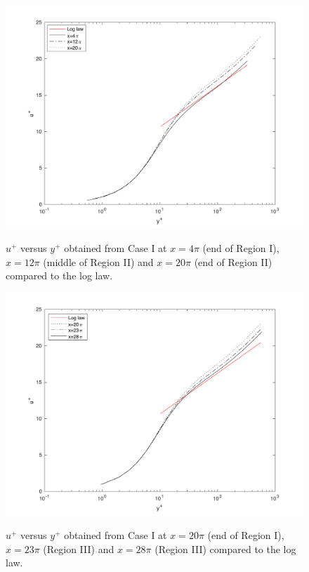 \documentclass[twocolumn,10pt]{asme2e}
\begin{document}
\begin{figure}[t]
\centering
\scalebox{0.5}
{\includegraphics{log_law_CI_upstream.pdf}}
\caption{\(u^+\) versus \(y^+\) obtained from Case I at \(x=4{\pi}\) (end of Region I), \(x=12{\pi}\) (middle of Region II) and \(x=20{\pi}\) (end of Region II) compared to the log law.}
\label{fig:log_law_CI_upstream}
\end{figure}

\begin{figure}[t]
\centering
\scalebox{0.5}
{\includegraphics{log_law_CI_downstream.pdf}}
\caption{\(u^+\) versus \(y^+\) obtained from Case I at \(x=20{\pi}\) (end of Region I), \(x=23{\pi}\) (Region III) and \(x=28{\pi}\) (Region III) compared to the log law.}
\label{fig:log_law_CI_downstream}
\end{figure}
\end{document}
